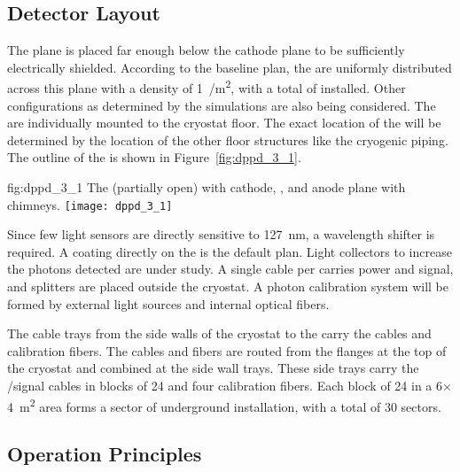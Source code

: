 \subsection{Detector Layout}
\label{sec:fddp-pd-1.4}

The  plane is placed far enough below the cathode plane to be sufficiently electrically shielded. According to the baseline plan, the  are uniformly distributed across this plane with a density of \SI{1}{/m^2}, with a total of \dpnumpmtch {} installed. Other  configurations as determined by the simulations are also being considered. The  are individually mounted to the cryostat floor. The exact location of the  will be determined by the location of the other floor structures like the cryogenic piping. The outline of the  is shown in Figure~\ref{fig:dppd_3_1}.

\begin{dunefigure}{fig:dppd_3_1}
{The  (partially open) with cathode, ,  and anode plane with chimneys.}
\texttt{[image: dppd\_3\_1]}
\end{dunefigure}

Since few light sensors are directly sensitive to \SI{127}{nm}, a wavelength shifter is required. A  coating directly on the  is the default plan. Light collectors to increase the photons detected are under study. A single cable per  carries power and signal, and splitters are placed outside the cryostat. A photon calibration system will be formed by external light sources and internal optical fibers.  

The cable trays from the side walls of the cryostat to the  carry the cables and calibration fibers. The cables and fibers are routed from the \fdth flanges at the top of the cryostat and  combined at the side wall trays. These side trays carry the /signal cables in blocks of \num{24}  and four calibration fibers. Each block of \num{24}  in a \num{6}$\times$\SI{4}{m^2} area forms a sector of underground installation, with a total of \num{30} sectors.

\subsection{Operation Principles}
\label{sec:fddp-pd-1.5}

